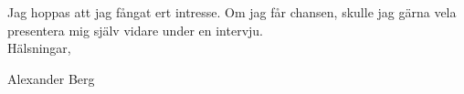 \documentclass[../main.tex]{subfiles}
\begin{document}

Jag hoppas att jag fångat ert intresse. Om jag får chansen, skulle jag gärna vela presentera mig själv vidare under en intervju.
\\

Hälsningar, 

Alexander Berg
\end{document}

